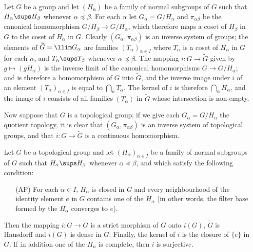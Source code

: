 Let $G$ be a group and let $(H_\alpha)$ be a family of normal subgroups of $G$ such that $H_\alpha\sups H_\beta$ whenever $\alpha\preceq\beta$. For each $\alpha$ let $G_\alpha=G/H_\alpha$ and $\pi_{\alpha\beta}$ be the canonical homomorphism $G/H_\beta\to G/H_\alpha$, which therefore maps a coset of $H_\beta$ in $G$ to the coset of $H_\alpha$ in $G$. Clearly $(G_\alpha,\pi_{\alpha\beta})$ is an inverse system of groups; the elements of $\widetilde{G}=\llim G_\alpha$ are families $(T_\alpha)_{\alpha\in I}$ where $T_\alpha$ is a coset of $H_\alpha$ in $G$ for each $\alpha$, and $T_\alpha\sups T_\beta$ whenever $\alpha\preceq\beta$. The mapping $i:G\to\widetilde{G}$ given by $g\mapsto(gH_\alpha)$ is the inverse limit of the canonical homomorphisms $G\to G/H_\alpha$; and is therefore a homomorphism of $G$ into $\widetilde{G}$, and the inverse image under $i$ of an element $(T_\alpha)_{\alpha\in I}$ is equal to $\bigcap_\alpha T_\alpha$. The kernel of $i$ is therefore $\bigcap_\alpha H_\alpha$, and the image of $i$ consists of all families $(T_\alpha)$ in $\widetilde{G}$ whose intersection is non-empty.\par
Now suppose that $G$ is a topological group; if we give each $G_\alpha=G/H_\alpha$ the quotient topology, it is clear that $(G_\alpha,\pi_{\alpha\beta})$ is an inverse system of topological groups, and that $i:G\to\widetilde{G}$ is a continuous homomorphism.
\begin{proposition}\label{topological group inverse limit of nbhd quotient prop}
Let $G$ be a topological group and let $(H_\alpha)_{\alpha\in I}$ be a family of normal subgroups of $G$ such that $H_\alpha\sups H_\beta$ whenever $\alpha\preceq\beta$, and which satisfy the following condition:
\begin{enumerate}
\item[(AP)] For each $\alpha\in I$, $H_\alpha$ is closed in $G$ and every neighbourhood of the identity element $e$ in $G$ contains one of the $H_\alpha$ (in other words, the filter base formed by the $H_\alpha$ converges to $e$). 
\end{enumerate}
Then the mapping $i:G\to\widetilde{G}$ is a strict morphism of $G$ onto $i(G)$, $\widetilde{G}$ is Hausdorff and $i(G)$ is dense in $G$. Finally, the kernel of $i$ is the closure of $\{e\}$ in $G$. If in addition one of the $H_\alpha$ is complete, then $i$ is surjective.
\end{proposition}
